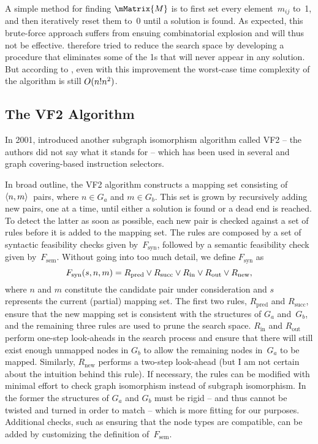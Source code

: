 A simple method for finding $\mMatrix{M}$ is to first set every element~$m_{ij}$
to~1, and then iteratively reset them to~0 until a solution is found.
%
As
expected, this brute-force approach suffers from ensuing combinatorial explosion
and will thus not be effective.
%
\citeauthor{Ullmann1976} therefore tried to
reduce the search space by developing a procedure that eliminates some of the 1s
that will never appear in any solution.
%
But according to
\textcite{Cordella2001}, even with this improvement the worst-case time
complexity of the algorithm is still \mbox{$O(n!n^2)$}.

\subsection{The VF2 Algorithm}

In 2001, \textcite{Cordella2001} introduced another \gls{subgraph isomorphism}
algorithm called \gls{VF2} -- the authors did not say what it stands for -- which
has been used in several  and \gls{graph covering}-based
instruction selectors.

In broad outline, the \gls{VF2} algorithm constructs a mapping set consisting of
\mbox{$\mTuple{n, m}$}~pairs, where \mbox{$n \in G_a$} and \mbox{$m \in G_b$}.
%
This set is grown by recursively adding new pairs, one at a time, until
either a solution is found or a dead end is reached.
%
To detect the latter as
soon as possible, each new pair is checked against a set of rules before it is
added to the mapping set.
%
The rules are composed by a set of syntactic
feasibility checks given by~$F_{\text{syn}}$, followed by a semantic feasibility
check given by~$F_{\text{sem}}$.
%
Without going into too much detail, we define
$F_{\text{syn}}$ as
\begin{displaymath}
  F_{\text{syn}}(s, n, m) = R_{\text{pred}} \vee R_{\text{succ}} \vee
  R_{\text{in}} \vee R_{\text{out}} \vee R_{\text{new}},
\end{displaymath}
where $n$ and $m$ constitute the candidate pair under consideration and $s$
represents the current (partial) mapping set.
%
The first two rules,
$R_{\text{pred}}$ and $R_{\text{succ}}$, ensure that the new mapping set is
consistent with the structures of $G_a$ and~$G_b$, and the remaining three rules
are used to prune the search space.
%
$R_{\text{in}}$ and $R_{\text{out}}$ perform
one-step look-aheads in the search process and ensure that there will still
exist enough unmapped nodes in $G_b$ to allow the remaining \glspl{node}
in~$G_a$ to be mapped.
%
Similarly, $R_{\text{new}}$ performs a two-step
look-ahead (but I am not certain about the intuition behind this rule).
%
If
necessary, the rules can be modified with minimal effort to check \gls{graph
  isomorphism} instead of \gls{subgraph isomorphism}.
%
In the former the
structures of $G_a$ and $G_b$ must be rigid -- and thus cannot be twisted and
turned in order to match -- which is more fitting for our purposes.
%
Additional
checks, such as ensuring that the \gls{node} types are compatible, can be added
by customizing the definition of~$F_{\text{sem}}$.


